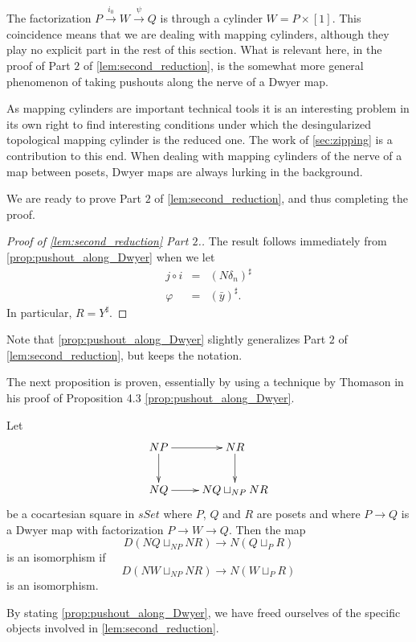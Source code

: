 The factorization $P\xrightarrow{i_0} W\xrightarrow{\psi } Q$ is through a cylinder $W=P\times [1]$. This coincidence means that we are dealing with mapping cylinders, although they play no explicit part in the rest of this section. What is relevant here, in the proof of Part $2$ of \cref{lem:second_reduction}, is the somewhat more general phenomenon of taking pushouts along the nerve of a Dwyer map.

As mapping cylinders are important technical tools it is an interesting problem in its own right to find interesting conditions under which the desingularized topological mapping cylinder is the reduced one. The work of \cref{sec:zipping} is a contribution to this end. When dealing with mapping cylinders of the nerve of a map between posets, Dwyer maps are always lurking in the background.

We are ready to prove Part $2$ of \cref{lem:second_reduction}, and thus completing the proof.
\begin{proof}[Proof of \cref{lem:second_reduction} Part $2$.]
The result follows immediately from \cref{prop:pushout_along_Dwyer} when we let
\begin{displaymath}
\begin{array}{rcl}
j\circ i & = & (N\delta _n)^\sharp \\
\varphi & = & (\bar{y} )^\sharp .
\end{array}
\end{displaymath}
In particular, $R=Y^\sharp$.
\end{proof}
\noindent Note that \cref{prop:pushout_along_Dwyer} slightly generalizes Part $2$ of \cref{lem:second_reduction}, but keeps the notation.

The next proposition is proven, essentially by using a technique by Thomason \cite[p.~316]{Th80} in his proof of Proposition 4.3 \cref{prop:pushout_along_Dwyer}.
\begin{proposition}\label{prop:pushout_along_Dwyer}
Let
\begin{displaymath}
\xymatrix{
NP \ar[d] \ar[r] & NR \ar[d] \\
NQ \ar[r] & NQ\sqcup _{NP}NR
}
\end{displaymath}
be a cocartesian square in $sSet$ where $P$, $Q$ and $R$ are posets and where $P\to Q$ is a Dwyer map with factorization $P\to W\to Q$. Then the map
\[D(NQ\sqcup _{NP}NR)\to N(Q\sqcup _PR)\]
is an isomorphism if
\[D(NW\sqcup _{NP}NR)\to N(W\sqcup _PR)\]
is an isomorphism.
\end{proposition}
\noindent By stating \cref{prop:pushout_along_Dwyer}, we have freed ourselves of the specific objects involved in \cref{lem:second_reduction}.

